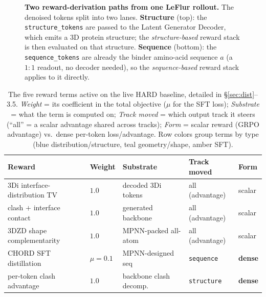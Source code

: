 \documentclass[11pt]{article}
\newcommand{\ttk}[1]{\texttt{\small #1}}
\begin{document}
\begin{figure}[htbp]
{%
}
\caption{\textbf{Two reward-derivation paths from one LeFlur rollout.} The denoised tokens split
into two lanes. \textcolor{aLine}{\textbf{Structure}} (top): the \ttk{structure\_tokens} are passed
to the Latent Generator Decoder, which emits a 3D protein structure; the
\emph{structure-based} reward stack is then evaluated on that structure. \textcolor{bLine}{\textbf{Sequence}}
(bottom): the \ttk{sequence\_tokens} are already the binder amino-acid sequence $a$ (a $1{:}1$
readout, no decoder needed), so the \emph{sequence-based} reward stack applies to it directly.}
\label{fig:reward-paths}
\end{figure}

\begin{table}[htbp]
\centering
{\renewcommand{\arraystretch}{1.25}%
\begin{tabular}{@{}>{\raggedright\arraybackslash}p{4.6cm}
                    >{\centering\arraybackslash}p{1.2cm}
                    >{\raggedright\arraybackslash}p{2.7cm}
                    >{\raggedright\arraybackslash}p{2.5cm}
                    >{\centering\arraybackslash}p{1.9cm}@{}}
\toprule
\textbf{Reward} & \textbf{Weight} & \textbf{Substrate} & \textbf{Track moved} & \textbf{Form}\\
\midrule
\rowcolor{dTint}3Di interface-distribution TV & $1.0$ & decoded 3Di tokens & all (advantage) & scalar\\
\rowcolor{aTint}clash $+$ interface contact   & $1.0$ & generated backbone & all (advantage) & scalar\\
\rowcolor{aTint}3DZD shape complementarity     & $1.0$ & MPNN-packed all-atom & all (advantage) & scalar\\
\rowcolor{bTint}CHORD SFT distillation         & $\mu{=}0.1$ & MPNN-designed seq & \ttk{sequence} & \textbf{dense}\\
\rowcolor{dTint}per-token clash advantage      & $1.0$ & backbone clash decomp.\ & \ttk{structure} & \textbf{dense}\\
\bottomrule
\end{tabular}}
\caption{The five reward terms active on the live HARD baseline, detailed in \S\ref{sec:dist}--3.5.
\emph{Weight} = its coefficient in the total objective ($\mu$ for the SFT loss);
\emph{Substrate} = what the term is computed on; \emph{Track moved} = which output track it
steers (``all'' = a scalar advantage shared across tracks); \emph{Form} = scalar reward (GRPO
advantage) vs.\ dense per-token loss/advantage. Row colors group terms by type (\textcolor{dLine}{blue}
distribution/structure, \textcolor{aLine}{teal} geometry/shape, \textcolor{bLine}{amber} SFT).}
\label{tab:rewardstack}
\end{table}
\end{document}
